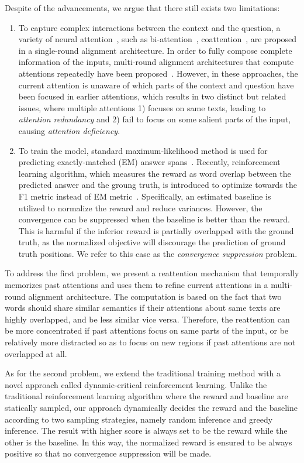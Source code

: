 \documentclass{article}
\begin{document}
Despite of the advancements, we argue that there still exists two limitations:
\begin{enumerate}
\item To capture complex interactions between the context and the question, a variety of neural attention~\cite{Bahdanau15}, such as bi-attention~\cite{Seo17}, coattention~\cite{Xiong16}, are proposed in a single-round alignment architecture. 
In order to fully compose complete information of the inputs, multi-round alignment architectures that compute attentions repeatedly have been proposed~\cite{Huang17,Xiong17}.
However, in these approaches, the current attention is unaware of which parts of the context and question have been focused in earlier attentions, which results in two distinct but related issues, where multiple attentions 1) focuses on same texts, leading to \emph{attention redundancy} and 2) fail to focus on some salient parts of the input, causing \emph{attention deficiency}.
\item To train the model, standard maximum-likelihood method is used for predicting exactly-matched (EM) answer spans~\cite{Wang17a}.
Recently, reinforcement learning algorithm, which measures the reward as word overlap between the predicted answer and the groung truth, is introduced to optimize towards the F1 metric instead of EM metric~\cite{Xiong17}.
Specifically, an estimated baseline is utilized to normalize the reward and reduce variances. 
However, the convergence can be suppressed when the baseline is better than the reward. This is harmful if the inferior reward is partially overlapped with the ground truth, as the normalized objective will discourage the prediction of ground truth positions.
We refer to this case as the \emph{convergence suppression} problem.
\end{enumerate}

To address the first problem, we present a reattention mechanism that temporally memorizes past attentions and uses them to refine current attentions in a multi-round alignment architecture.
The computation is based on the fact that two words should share similar semantics if their attentions about same texts are highly overlapped, and be less similar vice versa. 
Therefore, the reattention can be more concentrated if past attentions focus on same parts of the input, or be relatively more distracted so as to focus on new regions if past attentions are not overlapped at all.

As for the second problem, we extend the traditional training method with a novel approach called dynamic-critical reinforcement learning. Unlike the traditional reinforcement learning algorithm where the reward and baseline are statically sampled, our approach dynamically decides the reward and the baseline according to two sampling strategies, namely random inference and greedy inference. The result with higher score is always set to be the reward while the other is the baseline. In this way, the normalized reward is ensured to be always positive so that no convergence suppression will be made.
\end{document}
